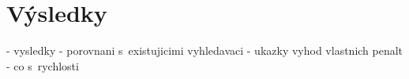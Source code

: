 \chapter{Výsledky}
- vysledky
  - porovnani s~existujicimi vyhledavaci
  - ukazky vyhod vlastnich penalt
  - co s~rychlosti
